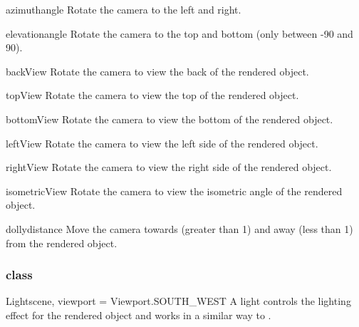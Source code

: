 \begin{methoddesc}[Camera]{azimuth}{angle}
Rotate the camera to the left and right.
\end{methoddesc}

\begin{methoddesc}[Camera]{elevation}{angle}
Rotate the camera to the top and bottom (only between -90 and 90).
\end{methoddesc}

\begin{methoddesc}[Camera]{backView}{}
Rotate the camera to view the back of the rendered object.
\end{methoddesc}

\begin{methoddesc}[Camera]{topView}{}
Rotate the camera to view the top of the rendered object.
\end{methoddesc}

\begin{methoddesc}[Camera]{bottomView}{}
Rotate the camera to view the bottom of the rendered object.
\end{methoddesc}

\begin{methoddesc}[Camera]{leftView}{}
Rotate the camera to view the left side of the rendered object.
\end{methoddesc}

\begin{methoddesc}[Camera]{rightView}{}
Rotate the camera to view the right side of the rendered object.
\end{methoddesc}

\begin{methoddesc}[Camera]{isometricView}{}
Rotate the camera to view the isometric angle of the rendered object.
\end{methoddesc}

\begin{methoddesc}[Camera]{dolly}{distance}
Move the camera towards (greater than 1) and away (less than 1) from
the rendered object.
\end{methoddesc}

\subsubsection{\Light class}

\begin{classdesc}{Light}{scene, viewport = Viewport.SOUTH_WEST}
A light controls the lighting effect for the rendered object and works in 
a similar way to \Camera.
\end{classdesc}

